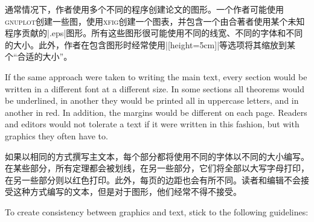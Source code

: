 通常情况下，作者使用多个不同的程序创建论文的图形。一个作者可能使用\textsc{gnuplot}创建一些图，使用\textsc{xfig}创建一个图表，并包含一个由合著者使用某个未知程序贡献的|.eps|图形。所有这些图形很可能使用不同的线宽、不同的字体和不同的大小。此外，作者在包含图形时经常使用|[height=5cm]|等选项将其缩放到某个“合适的大小”。

If the same approach were taken to writing the main text, every section would
be written in a different font at a different size. In some sections all
theorems would be underlined, in another they would be printed all in uppercase
letters, and in another in red. In addition, the margins would be different on
each page. Readers and editors would not tolerate a text if it were written in
this fashion, but with graphics they often have to.

如果以相同的方式撰写主文本，每个部分都将使用不同的字体以不同的大小编写。在某些部分，所有定理都会被划线，在另一些部分，它们将全部以大写字母打印，在另一些部分则以红色打印。此外，每页的边距也会有所不同。读者和编辑不会接受这种方式编写的文本，但是对于图形，他们经常不得不接受。

To create consistency between graphics and text, stick to the following
guidelines:

